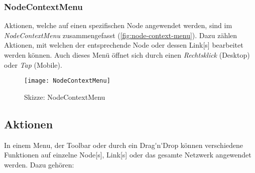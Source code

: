 

\subsubsection{NodeContextMenu}
Aktionen, welche auf einen spezifischen \gls{Node} angewendet werden, sind im \textit{NodeContextMenu} zusammengefasst (\autoref{fig:node-context-menu}). Dazu zählen Aktionen, mit welchen der entsprechende \gls{Node} oder dessen \gls{Link}[s] bearbeitet werden können. Auch dieses Menü öffnet sich durch einen \textit{Rechtsklick} (Desktop) oder \textit{Tap} (Mobile). 


\begin{figure}[htbp]
\centering
\texttt{[image: NodeContextMenu]}
\caption{Skizze: NodeContextMenu}
\label{fig:node-context-menu}
\end{figure}

\subsection{Aktionen}
\label{subsec:aktionen}
In einem Menu, der Toolbar oder durch ein \gls{Drag'n'Drop} können verschiedene Funktionen auf einzelne \gls{Node}[s], \gls{Link}[s] oder das gesamte \gls{Netzwerk} angewendet werden. Dazu gehören:

